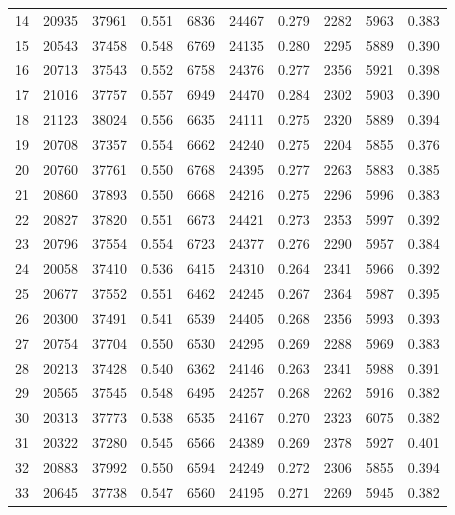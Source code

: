 \begin{table}
\begin{tabular}{c|C{1cm}C{1cm}C{1cm}|C{1cm}C{1cm}C{1cm}|C{1cm}C{1cm}C{1cm}}
14 & 20935 & 37961 & 0.551 & 6836 & 24467 & 0.279 & 2282 & 5963 & 0.383 \\
15 & 20543 & 37458 & 0.548 & 6769 & 24135 & 0.280 & 2295 & 5889 & 0.390 \\
16 & 20713 & 37543 & 0.552 & 6758 & 24376 & 0.277 & 2356 & 5921 & 0.398 \\
17 & 21016 & 37757 & 0.557 & 6949 & 24470 & 0.284 & 2302 & 5903 & 0.390 \\
18 & 21123 & 38024 & 0.556 & 6635 & 24111 & 0.275 & 2320 & 5889 & 0.394 \\
19 & 20708 & 37357 & 0.554 & 6662 & 24240 & 0.275 & 2204 & 5855 & 0.376 \\
20 & 20760 & 37761 & 0.550 & 6768 & 24395 & 0.277 & 2263 & 5883 & 0.385 \\
21 & 20860 & 37893 & 0.550 & 6668 & 24216 & 0.275 & 2296 & 5996 & 0.383 \\
22 & 20827 & 37820 & 0.551 & 6673 & 24421 & 0.273 & 2353 & 5997 & 0.392 \\
23 & 20796 & 37554 & 0.554 & 6723 & 24377 & 0.276 & 2290 & 5957 & 0.384 \\
24 & 20058 & 37410 & 0.536 & 6415 & 24310 & 0.264 & 2341 & 5966 & 0.392 \\
25 & 20677 & 37552 & 0.551 & 6462 & 24245 & 0.267 & 2364 & 5987 & 0.395 \\
26 & 20300 & 37491 & 0.541 & 6539 & 24405 & 0.268 & 2356 & 5993 & 0.393 \\
27 & 20754 & 37704 & 0.550 & 6530 & 24295 & 0.269 & 2288 & 5969 & 0.383 \\
28 & 20213 & 37428 & 0.540 & 6362 & 24146 & 0.263 & 2341 & 5988 & 0.391 \\
29 & 20565 & 37545 & 0.548 & 6495 & 24257 & 0.268 & 2262 & 5916 & 0.382 \\
30 & 20313 & 37773 & 0.538 & 6535 & 24167 & 0.270 & 2323 & 6075 & 0.382 \\
31 & 20322 & 37280 & 0.545 & 6566 & 24389 & 0.269 & 2378 & 5927 & 0.401 \\
32 & 20883 & 37992 & 0.550 & 6594 & 24249 & 0.272 & 2306 & 5855 & 0.394 \\
33 & 20645 & 37738 & 0.547 & 6560 & 24195 & 0.271 & 2269 & 5945 & 0.382 \\

\end{tabular}
\end{table}

